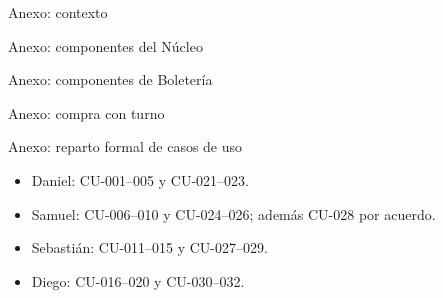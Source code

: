 \documentclass[aspectratio=169,10pt,xcolor={table}]{beamer}
\begin{document}
\appendix
\begin{frame}{Anexo: contexto}\centering\HexContexto\end{frame}
\begin{frame}{Anexo: componentes del Núcleo}\centering\HexComponentesNucleo\end{frame}
\begin{frame}{Anexo: componentes de Boletería}\centering\HexComponentesBoleteria\end{frame}
\begin{frame}{Anexo: compra con turno}\centering\HexSecuencia\end{frame}
\begin{frame}{Anexo: reparto formal de casos de uso}
\begin{itemize}
\item Daniel: CU-001--005 y CU-021--023.
\item Samuel: CU-006--010 y CU-024--026; además CU-028 por acuerdo.
\item Sebastián: CU-011--015 y CU-027--029.
\item Diego: CU-016--020 y CU-030--032.
\end{itemize}
\end{frame}
\end{document}
